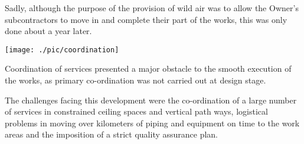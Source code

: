 \documentclass[justified, 11pt, a4paper]{tufte-book}
\begin{document}
Sadly, although the purpose of the provision of wild air was to allow the Owner's subcontractors to move in and complete their part of the works, this was only done about a year later.


\begin{marginfigure}
\texttt{[image: ./pic/coordination]}
\caption{Coordination of services presented a major obstacle to the smooth execution of the works, as primary co-ordination was not carried out at design stage.}
\end{marginfigure}

The challenges facing this development were the co-ordination of a large number of services in constrained ceiling spaces and vertical path ways, logistical problems in moving over kilometers of piping and equipment on time to the work areas and the imposition of a strict quality assurance plan.   



 
\end{document}

